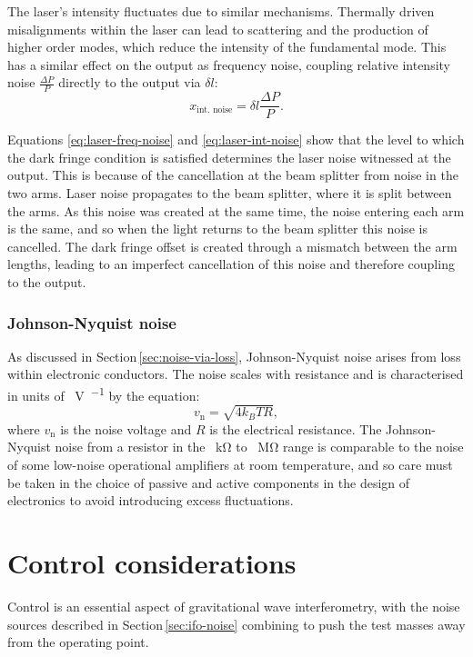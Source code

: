 The laser's intensity fluctuates due to similar mechanisms. Thermally driven misalignments within the laser can lead to scattering and the production of higher order modes, which reduce the intensity of the fundamental mode. This has a similar effect on the output as frequency noise, coupling relative intensity noise $\frac{\Delta P}{P}$ directly to the output via $\delta l$:
\begin{equation}
  \label{eq:laser-int-noise}
  x_{\text{int. noise}} = \delta l \frac{\Delta P}{P}.
\end{equation}

Equations \ref{eq:laser-freq-noise} and \ref{eq:laser-int-noise} show that the level to which the dark fringe condition is satisfied determines the laser noise witnessed at the output. This is because of the cancellation at the beam splitter from noise in the two arms. Laser noise propagates to the beam splitter, where it is split between the arms. As this noise was created at the same time, the noise entering each arm is the same, and so when the light returns to the beam splitter this noise is cancelled. The dark fringe offset is created through a mismatch between the arm lengths, leading to an imperfect cancellation of this noise and therefore coupling to the output.

\subsubsection{Johnson-Nyquist noise}
As discussed in Section\,\ref{sec:noise-via-loss}, Johnson-Nyquist noise arises from loss within electronic conductors. The noise scales with resistance and is characterised in units of \SI{}{\volt\per\sqrthz} by the equation:
\begin{equation}
  v_{\text{n}} = \sqrt{4 k_B T R},
\end{equation}
where $v_{\text{n}}$ is the noise voltage and $R$ is the electrical resistance. The Johnson-Nyquist noise from a resistor in the \SI{}{\kilo\ohm} to \SI{}{\mega\ohm} range is comparable to the noise of some low-noise operational amplifiers at room temperature, and so care must be taken in the choice of passive and active components in the design of electronics to avoid introducing excess fluctuations.

\section{Control considerations}
Control is an essential aspect of gravitational wave interferometry, with the noise sources described in Section\,\ref{sec:ifo-noise} combining to push the test masses away from the operating point.


